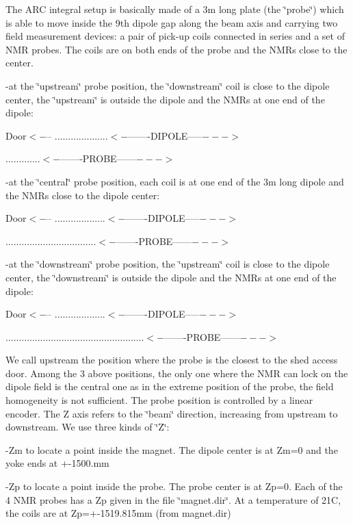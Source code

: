 The ARC integral setup is basically made of a 3m long plate (the 
\char`\"{}probe\char`\"{})
which is able to move inside the 9th dipole gap along the beam axis and carrying 
two
field measurement devices: a pair of pick-up coils connected in series and a
set of NMR probes. The coils are on both ends of the probe and the NMRs close
to the center. 

-at the \char`\"{}upstream\char`\"{} probe position, the 
\char`\"{}downstream\char`\"{}
coil is close to the dipole center, the \char`\"{}upstream\char`\"{} is outside
the dipole and the NMRs at one end of the dipole: 

Door$<-$-- ....................$<-$-------DIPOLE-----$--->$ 

.............$<-$-------PROBE------$--->$ 

-at the \char`\"{}central\char`\"{} probe position, each coil is at one end
of the 3m long dipole and the NMRs close to the dipole center: 

Door$<-$-- ...................$<-$-------DIPOLE-----$--->$ 

..................................$<-$-------PROBE------$--->$ 

-at the \char`\"{}downstream\char`\"{} probe position, the 
\char`\"{}upstream\char`\"{}
coil is close to the dipole center, the \char`\"{}downstream\char`\"{} is outside
the dipole and the NMRs at one end of the dipole: 

Door$<-$-- ...................$<-$-------DIPOLE-----$--->$ 

....................................................$<-$-------PROBE------$--->$ 

We call upstream the position where the probe is the closest to the shed access
door. Among the 3 above positions, the only one where the NMR can lock on the 
dipole
field is the central one as in the extreme position of the probe, the field 
homogeneity
is not sufficient. The probe position is controlled by a linear encoder. The
Z axis refers to the \char`\"{}beam\char`\"{} direction, increasing from upstream
to downstream. We use three kinds of \char`\"{}Z\char`\"{}: 

-Zm to locate a point inside the magnet. The dipole center is at Zm=0 and the
yoke ends at +-1500.mm 

-Zp to locate a point inside the probe. The probe center is at Zp=0. Each of
the 4 NMR probes has a Zp given in the file \char`\"{}magnet.dir\char`\"{}.
At a temperature of 21C, the coils are at Zp=+-1519.815mm (from magnet.dir) 

